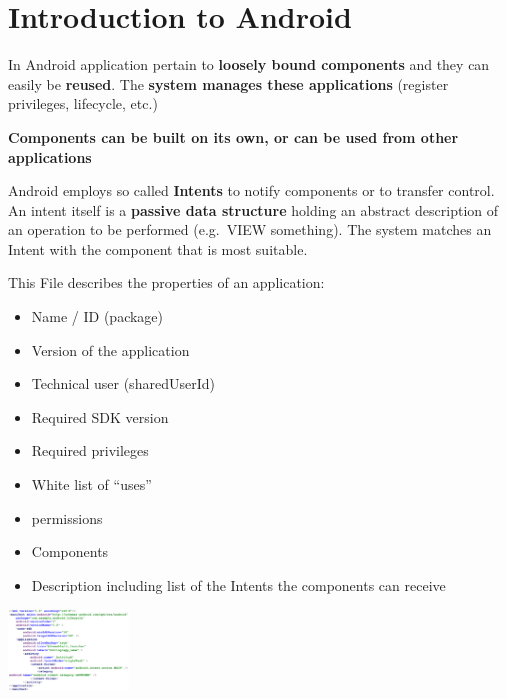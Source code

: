 \section{Introduction to Android}

\begin{breakbox}

In Android application pertain to \textbf{loosely bound components} and
they can easily be \textbf{reused}. The \textbf{system manages these
applications} (register privileges, lifecycle, etc.)

\textbf{Components can be built on its own, or can be used from other
applications}

\end{breakbox}

\begin{breakbox}

Android employs so called \textbf{Intents} to notify components or to
transfer control. An intent itself is a \textbf{passive data structure} holding
an abstract description of an operation to be performed (e.g.~VIEW
something). The system matches an Intent with the component that is most
suitable.
\end{breakbox}

\begin{breakbox}

This File describes the properties of an application: 
\begin{itemize}
    \item Name / ID (package)
    \item Version of the application
    \item Technical user (sharedUserId) 
    \item Required SDK version 
    \item Required privileges
    \item White list of ``uses''
    \item permissions
    \item Components
    \item Description including list of the Intents the components can receive
\end{itemize}

\includegraphics[width=0.24\textwidth]{figures/androidManifest.png}

\end{breakbox}

